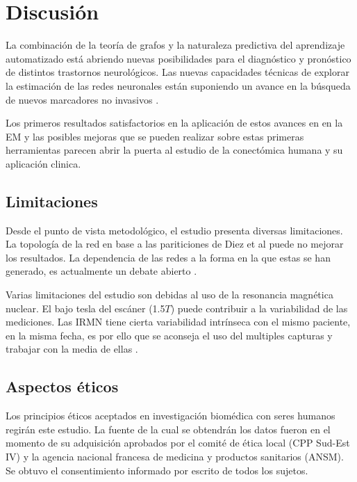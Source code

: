 \documentclass[fleqn,12pt]{UICArticle} %
\begin{document}
\section{Discusión}

La combinación de la teoría de grafos y la naturaleza predictiva del aprendizaje automatizado está abriendo nuevas posibilidades para el diagnóstico y pronóstico de distintos trastornos neurológicos. Las nuevas capacidades técnicas de explorar la estimación de las redes neuronales están suponiendo un avance en la búsqueda de nuevos marcadores no invasivos \cite{Tymofiyeva2017,Fornito2015,Sun2016}.

Los primeros resultados satisfactorios en la aplicación de estos avances en en la EM \cite{Kocevar2016,Muthuraman2016} y las posibles mejoras que se pueden realizar sobre estas primeras herramientas parecen abrir la puerta al estudio de la conectómica humana y su aplicación clinica.

\subsection{Limitaciones}

Desde el punto de vista metodológico, el estudio presenta diversas limitaciones. La topología de la red en base a las pariticiones de Diez et al puede no mejorar los resultados. La dependencia de las redes a la forma en la que estas se han generado, es actualmente un debate abierto \cite{Zalesky2010}. 

Varias limitaciones del estudio son debidas al uso de la resonancia magnética nuclear. El bajo tesla del escáner (1.5$T$) puede contribuir a la variabilidad de las mediciones. Las IRMN tiene cierta variabilidad intrínseca con el mismo paciente, en la misma fecha, es por ello que se aconseja el uso del multiples capturas y trabajar con la media de ellas \cite{Landman2007}.

\subsection{Aspectos éticos}

Los principios éticos aceptados en investigación biomédica con seres humanos regirán este estudio. La fuente de la cual se obtendrán los datos fueron en el momento de su adquisición aprobados por el comité de ética local (CPP Sud-Est IV) y la agencia nacional francesa de medicina y productos sanitarios (ANSM). Se obtuvo el consentimiento informado por escrito de todos los sujetos.
\end{document}
